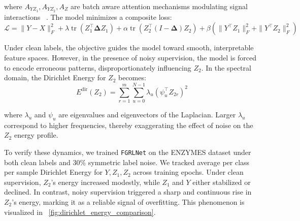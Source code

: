 where \( A_{YZ_1}, A_{YZ_2}, A_Z \) are batch aware attention mechanisms modulating signal interactions ~\citep{hlffgnn}. The model minimizes a composite loss:
\[
\mathcal{L} = \|Y - X\|_F^2 + \lambda \operatorname{tr}(Z_1^\top \mathbf{\Delta} Z_1) + \alpha \operatorname{tr}(Z_2^\top (I - \mathbf{\Delta}) Z_2) + \beta (\|Y^\top Z_1\|_F^2 + \|Y^\top Z_2\|_F^2)
\]

Under clean labels, the objective guides the model toward smooth, interpretable feature spaces. However, in the presence of noisy supervision, the model is forced to encode erroneous patterns, disproportionately influencing \( Z_2 \). In the spectral domain, the Dirichlet Energy for \( Z_2 \) becomes:
\[
E^{\text{dir}}(Z_2) = \sum_{r=1}^m \sum_{u=0}^{N-1} \lambda_u (\psi_u^\top Z_{2r})^2
\]

where \( \lambda_u \) and \( \psi_u \) are eigenvalues and eigenvectors of the Laplacian. Larger \( \lambda_u \) correspond to higher frequencies, thereby exaggerating the effect of noise on the \( Z_2 \) energy profile.

To verify these dynamics, we trained \texttt{FGRLNet} on the ENZYMES dataset under both clean labels and 30\% symmetric label noise. We tracked average per class per sample Dirichlet Energy for \( Y, Z_1, Z_2 \) across training epochs. Under clean supervision, \( Z_2 \)'s energy increased modestly, while \( Z_1 \) and \( Y \) either stabilized or declined. In contrast, noisy supervision triggered a sharp and continuous rise in \( Z_2 \)'s energy, marking it as a reliable signal of overfitting. This phenomenon is visualized in ~\ref{fig:dirichlet_energy_comparison}.




